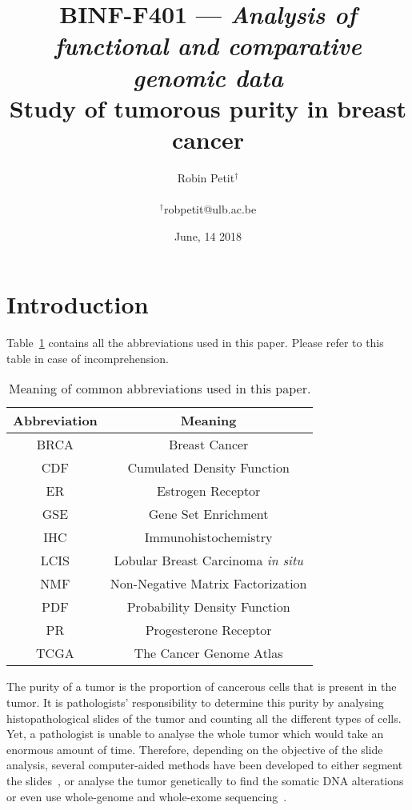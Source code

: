 \documentclass[letterpaper]{article}
\title{BINF-F401 --- \textit{Analysis of functional and comparative genomic data}\\
Study of tumorous purity in breast cancer}
\author{Robin Petit$^\dagger$\\
\mbox{}\\
$^\dagger$robpetit@ulb.ac.be}
\date{June, 14 2018}
\begin{document}
\maketitle

\section{Introduction}
Table~\ref{tab:abbrev} contains all the abbreviations used in this paper. Please refer to this table in case of incomprehension.

\begin{table}[!h]
\centering
\begin{tabular}{|c|c|}
\hline
Abbreviation & Meaning \\ \hline \hline
BRCA & Breast Cancer \\ \hline
CDF & Cumulated Density Function \\ \hline
ER & Estrogen Receptor \\ \hline
GSE & Gene Set Enrichment \\ \hline
IHC & Immunohistochemistry \\ \hline
LCIS & Lobular Breast Carcinoma \textit{in situ} \\ \hline
NMF & Non-Negative Matrix Factorization \\ \hline
PDF & Probability Density Function \\ \hline
PR & Progesterone Receptor \\ \hline
TCGA & The Cancer Genome Atlas \\ \hline
\end{tabular}
\caption{Meaning of common abbreviations used in this paper.\label{tab:abbrev}}
\end{table}

The purity of a tumor is the proportion of cancerous cells that is present in the tumor. It is pathologists' responsibility to determine this purity
by analysing histopathological slides of the tumor and counting all the different types of cells. Yet, a pathologist is unable to analyse the whole
tumor which would take an enormous amount of time. Therefore, depending on the objective of the slide analysis, several computer-aided methods have
been developed to either segment the slides~\citep{sirinukunwattana2016locality,xing2016robust,komura2017machine}, or analyse the tumor genetically
to find the somatic DNA alterations~\citep{carter2012absolute} or even use whole-genome and whole-exome sequencing~\citep{oesper2014quantifying}.
\end{document}
